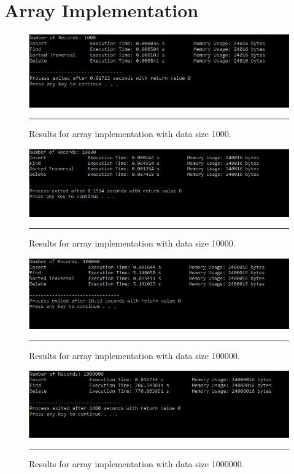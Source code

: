 \chapter{Array Implementation} %
\label{Chapter4}

\begin{figure}[H]
	\centering
	\includegraphics[scale =0.7]{./Figures/Array1000.jpg}
	\rule{35em}{0.5pt}
	\caption{Results for array implementation with data size 1000.}
	\label{fig:Array 1000}
\end{figure}

\begin{figure}[H]
	\centering
	\includegraphics[scale =0.7]{./Figures/Array10000.jpg}
	\rule{35em}{0.5pt}
	\caption{Results for array implementation with data size 10000.}
	\label{fig:Array 10000}
\end{figure}

\begin{figure}[H]
	\centering
	\includegraphics[scale =0.7]{./Figures/Array100000.jpg}
	\rule{35em}{0.5pt}
	\caption{Results for array implementation with data size 100000.}
	\label{fig:Array 100000}
\end{figure}

\begin{figure}[H]
	\centering
	\includegraphics[scale =0.7]{./Figures/Array1000000.jpg}
	\rule{35em}{0.5pt}
	\caption{Results for array implementation with data size 1000000.}
	\label{fig:Array 1000000}
\end{figure}
